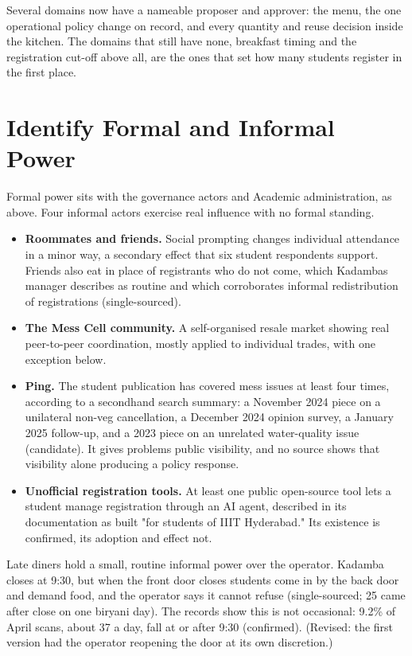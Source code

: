 \documentclass[
  10pt,
  table]{article}
\newcounter{none} %
\providecommand{\tightlist}{%
  \setlength{\itemsep}{0pt}\setlength{\parskip}{0pt}}
\renewcommand{\tightlist}{\setlength{\itemsep}{1.5pt}\setlength{\parskip}{0pt}}
\begin{document}
Several domains now have a nameable proposer and approver: the menu, the one operational policy change on record, and every quantity and reuse decision inside the kitchen. The domains that still have none, breakfast timing and the registration cut-off above all, are the ones that set how many students register in the first place.

\section{Identify Formal and Informal Power}\label{identify-formal-and-informal-power}

Formal power sits with the governance actors and Academic administration, as above. Four informal actors exercise real influence with no formal standing.

\begin{itemize}
\tightlist
\item
  \textbf{Roommates and friends.} Social prompting changes individual attendance in a minor way, a secondary effect that six student respondents support. Friends also eat in place of registrants who do not come, which Kadamba\textquotesingle s manager describes as routine and which corroborates informal redistribution of registrations (single-sourced).
\item
  \textbf{The Mess Cell community.} A self-organised resale market showing real peer-to-peer coordination, mostly applied to individual trades, with one exception below.
\item
  \textbf{Ping.} The student publication has covered mess issues at least four times, according to a secondhand search summary: a November 2024 piece on a unilateral non-veg cancellation, a December 2024 opinion survey, a January 2025 follow-up, and a 2023 piece on an unrelated water-quality issue (candidate). It gives problems public visibility, and no source shows that visibility alone producing a policy response.
\item
  \textbf{Unofficial registration tools.} At least one public open-source tool lets a student manage registration through an AI agent, described in its documentation as built "for students of IIIT Hyderabad." Its existence is confirmed, its adoption and effect not.
\end{itemize}

Late diners hold a small, routine informal power over the operator. Kadamba closes at 9:30, but when the front door closes students come in by the back door and demand food, and the operator says it cannot refuse (single-sourced; 25 came after close on one biryani day). The records show this is not occasional: 9.2\% of April scans, about 37 a day, fall at or after 9:30 (confirmed). (Revised: the first version had the operator reopening the door at its own discretion.)
\end{document}
